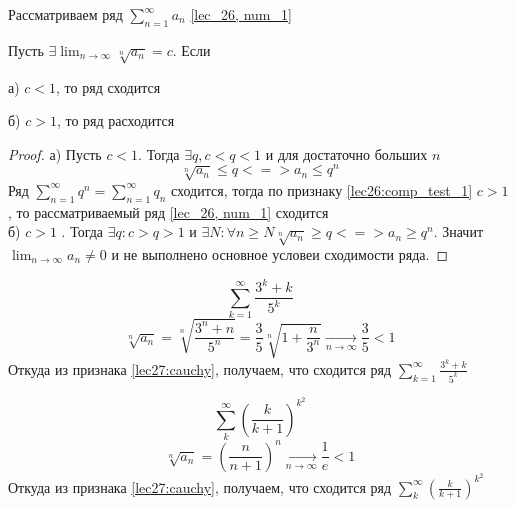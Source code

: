 \documentclass[../../main.tex]{subfiles}
\begin{document}
	
	Рассматриваем ряд $\sum_{n=1}^{\infty} a_n$ \ref{lec_26, num_1}
	
	\begin{thm}\label{lec27:cauchy} 
		
		Пусть $\exists \lim_{n \to \infty } \sqrt[n]{a_n}  = c$. Если
		
			а) $c < 1$, то ряд сходится 
			
			б) $c>1$, то ряд расходится
		
	\begin{proof}
		 а) Пусть $c < 1$. Тогда $\exists q, c < q < 1$ и для достаточно больших $n$
			\[ \sqrt[n]{a_n} \leq q <=> a_n \leq q^n \]
			Ряд $\sum_{n=1}^{\infty} q^n = \sum_{n=1}^{\infty} q_n$ сходится, тогда по признаку \ref{lec26:comp_test_1}
			 $c>1$, то рассматриваемый ряд \ref{lec_26, num_1} сходится \\
			 
			 б) $c>1$ . Тогда $\exists q : c > q > 1 $ и $\exists N : \forall n \geq N \sqrt[n]{a_n} \geq q <=> a_n \geq q^n$. Значит $\lim_{n \to \infty} a_n \neq 0$ и не выполнено основное условеи сходимости ряда.
		
		
	\end{proof}
	\end{thm}

	\begin{example}
		\[ \sum_{k=1}^{\infty}  \frac{3^k + k}{5^k}  \]
		\[ \sqrt[n]{a_n} = \sqrt[n]{\frac{3^n + n}{5^n}} = \frac{3}{5} \sqrt[n]{1 + \frac{n}{3^n}}  \underset{n \rightarrow \infty}
		{\longrightarrow} \frac{3}{5} < 1    \]
		Откуда из признака \ref{lec27:cauchy}, получаем, что сходится ряд $\sum_{k=1}^{\infty}  \frac{3^k + k}{5^k}$
		
	\end{example} 
 
	\begin{example}
		\[ \sum_{k}^{\infty} \left( \frac{k}{k+1}\right) ^{k^2}   \]
		\[ \sqrt[n]{a_n} =  \left( \frac{n}{n+1}\right) ^n  \underset{n \rightarrow \infty}
		{\longrightarrow} \frac{1}{e} < 1  \]
		Откуда из признака \ref{lec27:cauchy}, получаем, что сходится ряд $\sum_{k}^{\infty} \left( \frac{k}{k+1}\right) ^{k^2}$
		
		
	\end{example} 	
\end{document}
